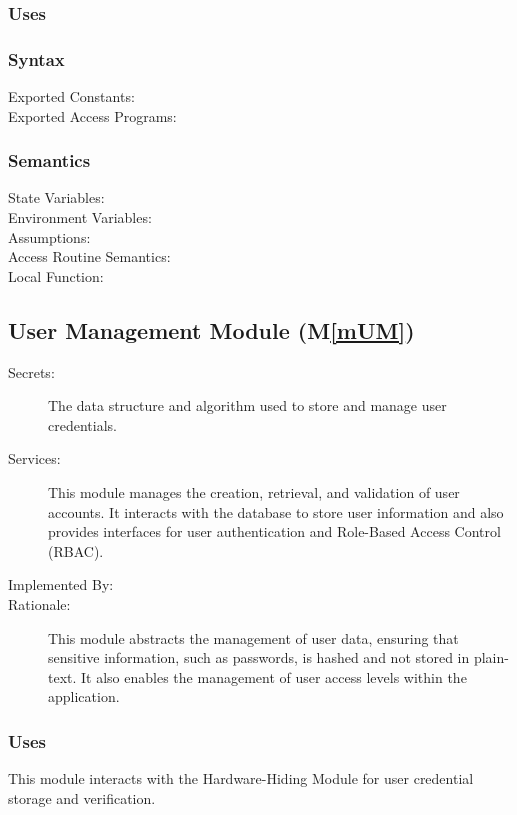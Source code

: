 \documentclass[12pt, titlepage]{article}
\newcommand{\mref}[1]{M\ref{#1}}
\begin{document}
\subsubsection{Uses}

\subsubsection{Syntax}
\begin{description}
  \item[Exported Constants:] 
  \item[Exported Access Programs:] 
\end{description}

\subsubsection{Semantics}
\begin{description}
  \item[State Variables:]
  \item[Environment Variables:]  
  \item[Assumptions:] 
  \item[Access Routine Semantics:] 
  \item[Local Function:] 
\end{description}

\subsection{User Management Module (\mref{mUM})}
\begin{description}
  \item[Secrets:] The data structure and algorithm used to store and manage user
  credentials.
  \item[Services:]This module manages the creation, retrieval, and validation of
  user accounts. It interacts with the database to store user information and
  also provides interfaces for user authentication and Role-Based Access
  Control (RBAC).
  \item[Implemented By:] \progname{}
  \item[Rationale:] This module abstracts the management of user data, ensuring
  that sensitive information, such as passwords, is hashed and not stored in
  plain-text. It also enables the management of user access levels within the
  application. 
\end{description}

\subsubsection{Uses}
This module interacts with the Hardware-Hiding Module for user credential
storage and verification.
\end{document}
